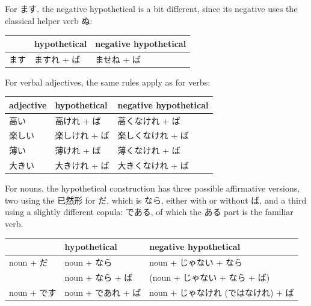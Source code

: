 \documentclass[11pt, b5paper, twoside, openright, onecolumn]{book}
\newenvironment{mytabular}[1]{\noindent\hspace{0.4in}
\begin{tabular}[h]{#1}}{\end{tabular}}
\newenvironment{mytabularcentered}[1]{\noindent
\begin{center}\begin{tabular}[h]{#1}}{\end{tabular}\end{center}}
\begin{document}
For ます‚ the negative hypothetical is a bit different‚ since its negative uses the classical helper verb ぬ:

\vspace{0.5cm}
\smaller
\begin{mytabular}{| l  l  l |}\hline 
\rule{0pt}{2.4ex} & hypothetical & negative hypothetical\\ 
\hline
\rule{0pt}{2.4ex}ます & ますれ + ば & ませね + ば\\ 
\hline 
\end{mytabular}
\larger
\vspace{0.5cm}


For verbal adjectives‚ the same rules apply as for verbs:

\vspace{0.5cm}
\smaller
\begin{mytabular}{| l  l  l |}\hline 
\rule{0pt}{2.4ex}adjective & hypothetical & negative hypothetical\\ 
\hline
\rule{0pt}{2.4ex}高い & 高けれ + ば & 高くなけれ + ば\\ 
\rule{0pt}{2.4ex}楽しい & 楽しけれ + ば & 楽しくなけれ + ば\\ 
\rule{0pt}{2.4ex}薄い & 薄けれ + ば & 薄くなけれ + ば\\ 
\rule{0pt}{2.4ex}大きい & 大きけれ + ば & 大きくなけれ + ば\\ 
\hline 
\end{mytabular}
\larger
\vspace{0.5cm}


For nouns‚ the hypothetical construction has three possible affirmative versions‚ two using the 已然形 for だ‚ which is なら‚ either with or without ば‚ and a third using a slightly different copula: である‚ of which the ある part is the familiar verb.

\vspace{0.5cm}
\smaller
\begin{center}
\begin{mytabularcentered}{| l  l  l |}\hline 
\rule{0pt}{2.4ex} & hypothetical & negative hypothetical\\ 
\hline
\rule{0pt}{2.4ex}noun + だ & noun + なら & noun + じゃない + なら\\ 
\rule{0pt}{2.4ex} & noun + なら + ば & (noun + じゃない + なら + ば)\\ 
\rule{0pt}{2.4ex}noun + です & noun + であれ + ば & noun + じゃなけれ (ではなけれ)  + ば\\ 
\hline 
\end{mytabularcentered}
\end{center}
\larger
\vspace{0.5cm}
\end{document}
